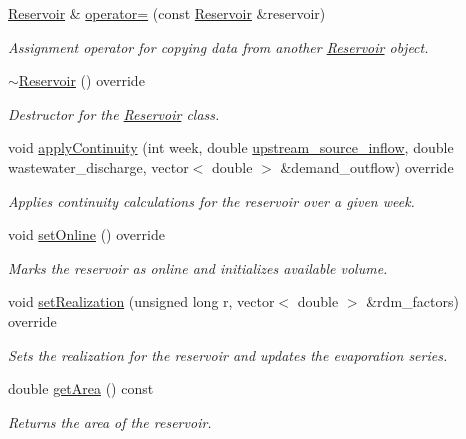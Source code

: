 \begin{DoxyCompactItemize}
\mbox{\hyperlink{classReservoir}{Reservoir}} \& \mbox{\hyperlink{classReservoir_a8b43209f25276f279986d87b5a77c4f1}{operator=}} (const \mbox{\hyperlink{classReservoir}{Reservoir}} \&reservoir)
\begin{DoxyCompactList}\small\item\em Assignment operator for copying data from another \mbox{\hyperlink{classReservoir}{Reservoir}} object. \end{DoxyCompactList}\item 
\mbox{\hyperlink{classReservoir_a2f8bfdc73c7470185775a940fb3531de}{$\sim$\+Reservoir}} () override
\begin{DoxyCompactList}\small\item\em Destructor for the \mbox{\hyperlink{classReservoir}{Reservoir}} class. \end{DoxyCompactList}\item 
void \mbox{\hyperlink{classReservoir_a66929c055193785bc9d47bcdf0bc7445}{apply\+Continuity}} (int week, double \mbox{\hyperlink{classWaterSource_a7a69b2e9b6030f1035e6cf44d2918ee5}{upstream\+\_\+source\+\_\+inflow}}, double wastewater\+\_\+discharge, vector$<$ double $>$ \&demand\+\_\+outflow) override
\begin{DoxyCompactList}\small\item\em Applies continuity calculations for the reservoir over a given week. \end{DoxyCompactList}\item 
void \mbox{\hyperlink{classReservoir_ac6f64dd92c401e58095e7b125855041b}{set\+Online}} () override
\begin{DoxyCompactList}\small\item\em Marks the reservoir as online and initializes available volume. \end{DoxyCompactList}\item 
void \mbox{\hyperlink{classReservoir_ad1bb7aa46397719d09e0b6188b9bc28d}{set\+Realization}} (unsigned long r, vector$<$ double $>$ \&rdm\+\_\+factors) override
\begin{DoxyCompactList}\small\item\em Sets the realization for the reservoir and updates the evaporation series. \end{DoxyCompactList}\item 
double \mbox{\hyperlink{classReservoir_af86ffdaa2842a38b7f59e0360a1004a1}{get\+Area}} () const
\begin{DoxyCompactList}\small\item\em Returns the area of the reservoir. \end{DoxyCompactList}\end{DoxyCompactItemize}
